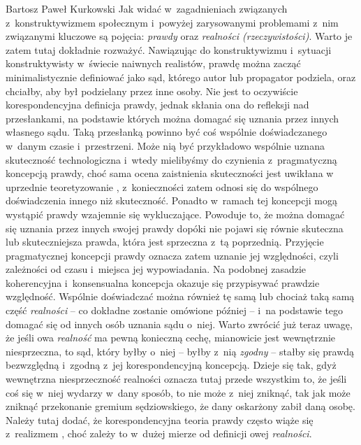 \begin{artplenv}{Bartosz Paweł Kurkowski}
Jak widać w~zagadnieniach związanych z~konstruktywizmem społecznym i~powyżej zarysowanymi problemami z~nim związanymi
kluczowe są pojęcia: \textit{prawdy }oraz\textit{ realności (rzeczywistości)}. Warto je zatem tutaj dokładnie rozważyć.
Nawiązując do konstruktywizmu i~sytuacji konstruktywisty w~świecie naiwnych realistów, prawdę można zacząć
minimalistycznie definiować jako sąd, którego autor lub propagator podziela, oraz chciałby, aby był podzielany przez
inne osoby. Nie jest to oczywiście korespondencyjna definicja prawdy, jednak skłania ona do refleksji nad przesłankami,
na podstawie których można domagać się uznania przez innych własnego sądu. Taką przesłanką powinno być coś wspólnie
doświadczanego w~danym czasie i~przestrzeni. Może nią być przykładowo wspólnie uznana skuteczność
technologiczna i~wtedy mielibyśmy do czynienia z~pragmatyczną koncepcją prawdy,
choć sama ocena zaistnienia skuteczności jest uwikłana w
uprzednie teoretyzowanie
\parencite[s.~264]{grobler_metodologia_2006},
z~konieczności zatem odnosi się do wspólnego
doświadczenia innego niż skuteczność. Ponadto w~ramach tej koncepcji mogą wystąpić prawdy wzajemnie się wykluczające.
Powoduje to, że można domagać się uznania przez innych swojej prawdy dopóki nie pojawi się równie skuteczna lub
skuteczniejsza prawda, która jest sprzeczna z~tą poprzednią. Przyjęcie pragmatycznej koncepcji prawdy oznacza zatem
uznanie jej względności, czyli zależności od czasu i~miejsca jej wypowiadania. Na podobnej zasadzie koherencyjna
i~konsensualna koncepcja okazuje się przypisywać prawdzie względność. Wspólnie doświadczać można również tę samą lub
chociaż taką samą część \textit{realności} -- co dokładne zostanie omówione później -- i~na podstawie tego domagać się od
innych osób uznania sądu o~niej. Warto zwrócić już teraz uwagę, że jeśli owa \textit{realność} ma pewną konieczną
cechę, mianowicie jest wewnętrznie niesprzeczna, to sąd, który byłby o~niej -- byłby z~nią \textit{zgodny} -- stałby się
prawdą bezwzględną i~zgodną z~jej korespondencyjną koncepcją. Dzieje się tak, gdyż wewnętrzna niesprzeczność realności
oznacza tutaj przede wszystkim to, że jeśli coś się w~niej wydarzy w~dany sposób, to nie może z~niej zniknąć, tak jak
może zniknąć przekonanie gremium sędziowskiego, że dany oskarżony zabił daną osobę. Należy tutaj dodać, że
korespondencyjna teoria prawdy często wiąże się z~realizmem
\parencite[s.~391]{gorazda_filozofia_2014},
choć
zależy to w~dużej mierze od definicji owej \textit{realności}.


\end{artplenv}
